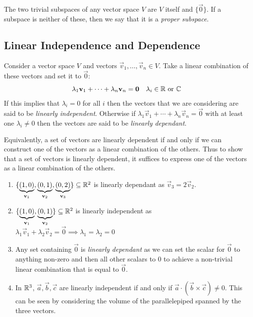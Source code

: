 \documentclass[../main.tex]{subfiles}
\begin{document}
The two trivial subspaces of any vector space $V$ are $V$ itself and $\{\vec{0}\}$.
If a subspace is neither of these, then we say that it is a \textit{proper subspace}.
\subsection{Linear Independence and Dependence}
\begin{definition}
  Consider a vector space $V$ and vectors $\vec{v}_1, \ldots, \vec{v}_n \in V$.
  Take a linear combination of these vectors and set it to $\vec{0}$:
  \[
    \lambda_1 \mathbf{\bm{v}}_1 + \cdots + \lambda_n \mathbf{\bm{v}}_n = \mathbf{\bm{0}} \quad \lambda_i \in \mathbb{R} \text{ or } \mathbb{C}
  \]
  If this implies that $\lambda_i = 0$ for all $i$ then the vectors that we are considering are said to be \textit{linearly independent}.
  Otherwise if $\lambda_1 \vec{v}_1 + \cdots + \lambda_n \vec{v}_n = \vec{0}$ with at least one $\lambda_i \neq 0$ then the vectors are said to be \textit{linearly dependant}.
\end{definition}
Equivalently, a set of vectors are linearly dependent if and only if we can construct one of the vectors as a linear combination of the others.
Thus to show that a set of vectors is linearly dependent, it suffices to express one of the vectors as a linear combination of the others.
\begin{example}
  \begin{enumerate}
    \item $\{\underbrace{(1, 0)}_{\mathbf{\bm{v}}_1}, \underbrace{(0, 1)}_{\mathbf{\bm{v}}_2}, \underbrace{(0, 2)}_{\mathbf{\bm{v}}_3}\} \subseteq \mathbb{R}^2$ is linearly dependant as $\vec{v}_3 = 2\vec{v}_2$.
    \item $\{\underbrace{(1, 0)}_{\mathbf{\bm{v}}_1}, \underbrace{(0, 1)}_{\mathbf{\bm{v}}_2}\} \subseteq \mathbb{R}^2$ is linearly independent as $\lambda_1 \vec{v}_1 + \lambda_2 \vec{v}_2 = \vec{0} \implies \lambda_1 = \lambda_2 = 0$
    \item Any set containing $\vec{0}$ is \textit{linearly dependant} as we can set the scalar for $\vec{0}$ to anything non-zero and then all other scalars to 0 to achieve a non-trivial linear combination that is equal to $\vec{0}$.
    \item In $\mathbb{R}^3$, $\vec{a}, \vec{b}, \vec{c}$ are linearly independent if and only if $\vec{a} \cdot (\vec{b} \times \vec{c}) \neq 0$.
      This can be seen by considering the volume of the parallelepiped spanned by the three vectors.
 \end{enumerate}
\end{example}
\end{document}

